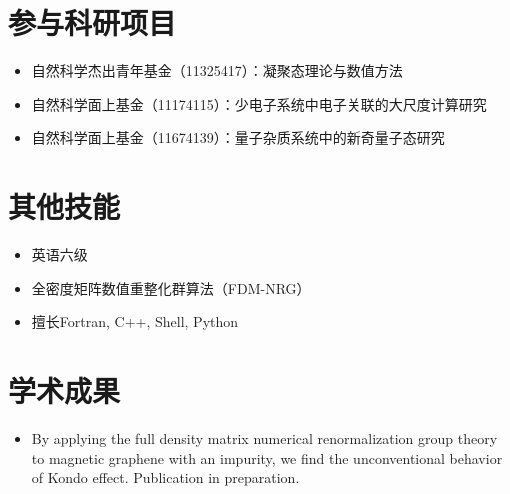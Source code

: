 \documentclass{resume}
\begin{document}
\section{参与科研项目}
\begin{itemize}
\item 自然科学杰出青年基金（11325417）：凝聚态理论与数值方法
\item 自然科学面上基金（11174115）：少电子系统中电子关联的大尺度计算研究
\item 自然科学面上基金（11674139）：量子杂质系统中的新奇量子态研究
\end{itemize}

\section{其他技能}
\begin{itemize}[parsep=0.5ex]
\item 英语六级
\item 全密度矩阵数值重整化群算法（FDM-NRG）
\item 擅长Fortran, C++, Shell, Python
\end{itemize}

\section{学术成果}
\begin{itemize}[parsep=0.5ex]
\item By applying the full density matrix numerical renormalization
  group theory to magnetic graphene with an impurity, we find the
  unconventional behavior of Kondo effect. Publication in preparation.
\end{itemize}


%  
\end{document}
